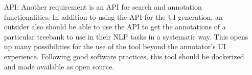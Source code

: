 \begin{itemize}[before=\normalfont, font=\itshape, align=left]
\item[API:]
Another requirement is an API for search and annotation functionalities.
In addition to using the API for the UI generation, an outsider also should be able to use the API to get the annotations of a particular treebank to use in their NLP tasks in a systematic way.
This opens up many possibilities for the use of the tool beyond the annotator's UI experience.
Following good software practices, this tool should be dockerized and made available as open source.
\end{itemize}
